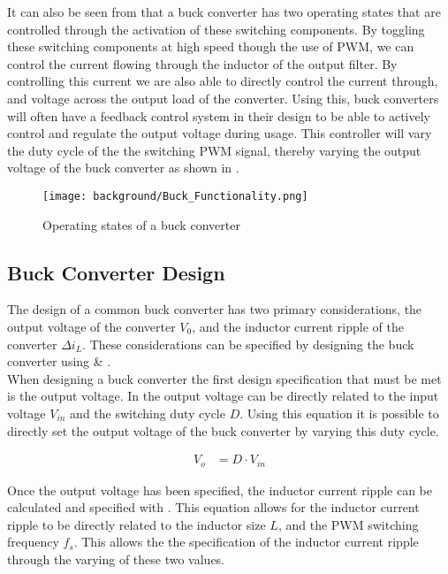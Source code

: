 It can also be seen from  that a buck converter has two operating states that are controlled through the activation of these switching components. By toggling these switching components at high speed though the use of PWM, we can control the current flowing through the inductor of the output filter. By controlling this current we are also able to directly control the current through, and voltage across the output load of the converter. Using this, buck converters will often have a feedback control system in their design to be able to actively control and regulate the output voltage during usage. This controller will vary the duty cycle of the the switching PWM signal, thereby varying the output voltage of the buck converter as shown in .\\

\begin{figure}[H]
	\texttt{[image: background/Buck\_Functionality.png]}
	\caption{Operating states of a buck converter}
	\label{F:buck_func}
\end{figure}


\subsection{Buck Converter Design}\label{S:buck_design_back}

The design of a common buck converter has two primary considerations, the output voltage of the converter $V_0$, and the inductor current ripple of the converter $\Delta i_L$. These considerations can be specified by designing the buck converter using  \&  \cite{Mohan2012_Design,Hauke2015}.\\ 

When designing a buck converter the first design specification that must be met is the output voltage. In  the output voltage can be directly related to the input voltage $V_{in}$ and the switching duty cycle $D$. Using this equation it is possible to directly set the output voltage of the buck converter by varying this duty cycle.

\begin{align}\label{E:V_out}
	V_o &= D \cdot V_{in}
\end{align}

Once the output voltage has been specified, the inductor current ripple can be calculated and specified with . This equation allows for the inductor current ripple to be directly related to the inductor size $L$, and the PWM switching frequency $f_s$. This allows the the specification of the inductor current ripple through the varying of these two values.

